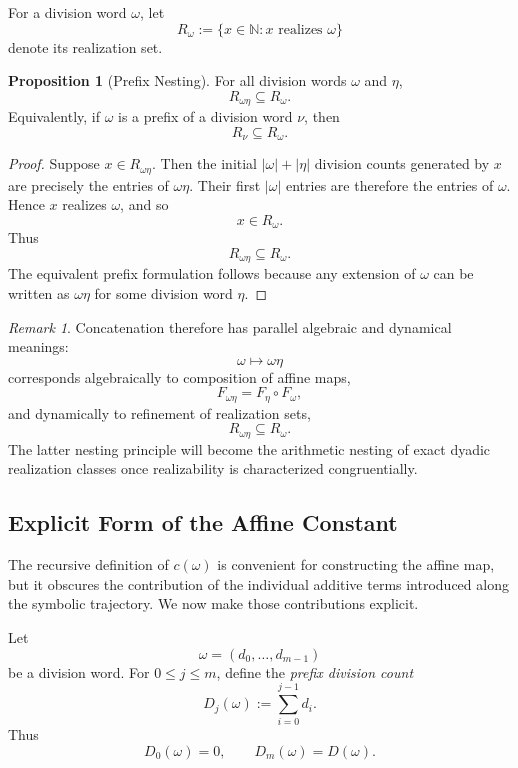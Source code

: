 \documentclass[12pt, oneside]{article}
\numberwithin{equation}{section}
\theoremstyle{definition}
\newtheorem{proposition}{Proposition}[section]
\theoremstyle{plain}
\theoremstyle{remark}
\newtheorem*{remark}{Remark}
\begin{document}
For a division word \(\omega\), let
\[
R_\omega
:=
\{x\in\mathbb N:x\text{ realizes }\omega\}
\]
denote its realization set.

\begin{proposition}[Prefix Nesting]
For all division words \(\omega\) and \(\eta\),
\[
R_{\omega\eta}\subseteq R_\omega.
\]
Equivalently, if \(\omega\) is a prefix of a division word \(\nu\), then
\[
R_\nu\subseteq R_\omega.
\]
\end{proposition}

\begin{proof}
Suppose \(x\in R_{\omega\eta}\). Then the initial
\(|\omega|+|\eta|\) division counts generated by \(x\) are precisely the
entries of \(\omega\eta\). Their first \(|\omega|\) entries are therefore
the entries of \(\omega\). Hence \(x\) realizes \(\omega\), and so
\[
x\in R_\omega.
\]
Thus
\[
R_{\omega\eta}\subseteq R_\omega.
\]
The equivalent prefix formulation follows because any extension of
\(\omega\) can be written as \(\omega\eta\) for some division word
\(\eta\).
\end{proof}

\begin{remark}
Concatenation therefore has parallel algebraic and dynamical meanings:
\[
\omega\longmapsto\omega\eta
\]
corresponds algebraically to composition of affine maps,
\[
F_{\omega\eta}=F_\eta\circ F_\omega,
\]
and dynamically to refinement of realization sets,
\[
R_{\omega\eta}\subseteq R_\omega.
\]
The latter nesting principle will become the arithmetic nesting of exact
dyadic realization classes once realizability is characterized
congruentially.
\end{remark}

\subsection{Explicit Form of the Affine Constant}

The recursive definition of \(c(\omega)\) is convenient for constructing
the affine map, but it obscures the contribution of the individual
additive terms introduced along the symbolic trajectory. We now make those
contributions explicit.

Let
\[
\omega=(d_0,\dots,d_{m-1})
\]
be a division word. For \(0\le j\le m\), define the \emph{prefix division
count}
\[
D_j(\omega)
:=
\sum_{i=0}^{j-1}d_i.
\]
Thus
\[
D_0(\omega)=0,
\qquad
D_m(\omega)=D(\omega).
\]
\end{document}
